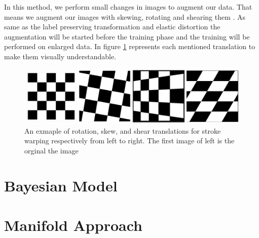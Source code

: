 In this method, we perform small changes in images to augment our data.  That means we augment our
images with skewing, rotating and shearing them \cite{storke_warping_1997_source}. As same as the
label preserving transformation and elastic distortion the augmentation will be started before the
training phase and the training will be performed on enlarged data. In figure
\ref{fig:stroke_warping_transforamtions} represents each mentioned translation to make them visually
understandable.

\begin{figure}
  \centering
  \label{fig:stroke_warping_transforamtions}
  \includegraphics[width=1\textwidth]{fig/stroke_warping_transforamtions}
  \caption{An exmaple of rotation, skew, and shear translations for stroke warping respectively from left to right. The first image of left is the orginal the image \cite{TODO-Augmentaion}}
\end{figure}


\section{Bayesian Model}
\label{tit:bayesian-model}




\section{Manifold Approach}
\label{tit:manifold-approach}